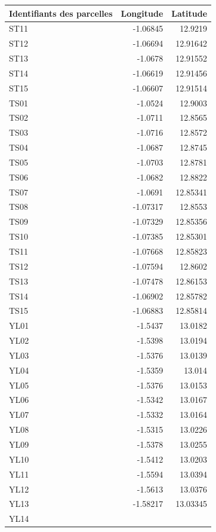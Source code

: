 \documentclass[a4paper,11pt]{article}
\begin{document}
\begin{table}
    \begin{center}
     \begin{tabular}{|l|r|r|}
       \hline Identifiants des parcelles & Longitude & Latitude
       \\ \hline ST11 & -1.06845 & 12.9219 \\ ST12 & -1.06694 &
       12.91642 \\ ST13 & -1.0678 & 12.91552 \\ ST14 & -1.06619 &
       12.91456 \\ ST15 & -1.06607 & 12.91514 \\ TS01 & -1.0524 &
       12.9003 \\ TS02 & -1.0711 & 12.8565 \\ TS03 & -1.0716 & 12.8572
       \\ TS04 & -1.0687 & 12.8745 \\ TS05 & -1.0703 & 12.8781 \\ TS06
       & -1.0682 & 12.8822 \\ TS07 & -1.0691 & 12.85341 \\ TS08 &
       -1.07317 & 12.8553 \\ TS09 & -1.07329 & 12.85356 \\ TS10 &
       -1.07385 & 12.85301 \\ TS11 & -1.07668 & 12.85823 \\ TS12 &
       -1.07594 & 12.8602 \\ TS13 & -1.07478 & 12.86153 \\ TS14 &
       -1.06902 & 12.85782 \\ TS15 & -1.06883 & 12.85814 \\ YL01 &
       -1.5437 & 13.0182 \\ YL02 & -1.5398 & 13.0194 \\ YL03 & -1.5376
       & 13.0139 \\ YL04 & -1.5359 & 13.014 \\ YL05 & -1.5376 &
       13.0153 \\ YL06 & -1.5342 & 13.0167 \\ YL07 & -1.5332 & 13.0164
       \\ YL08 & -1.5315 & 13.0226 \\ YL09 & -1.5378 & 13.0255 \\ YL10
       & -1.5412 & 13.0203 \\ YL11 & -1.5594 & 13.0394 \\ YL12 &
       -1.5613 & 13.0376 \\ YL13 & -1.58217 & 13.03345 \\ YL14 &

\end{tabular}
\end{center}
\end{table}
\end{document}

